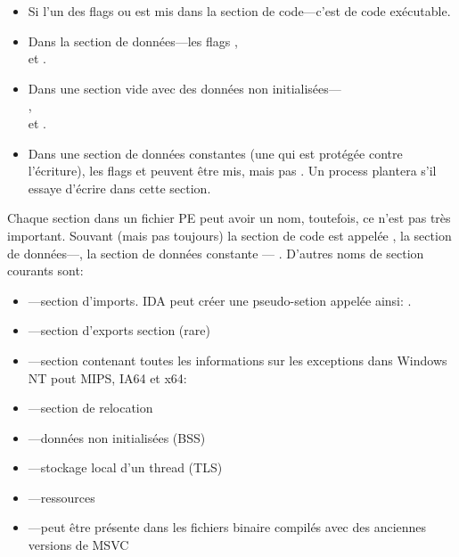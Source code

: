 \begin{itemize}
\item Si l'un des flags  ou 
est mis dans la section de code---c'est de code exécutable.

\item Dans la section de données---les flags ,\\
 et .

\item Dans une section vide avec des données non initialisées---\\
,  \\
et .

\item Dans une section de données constantes (une qui est protégée contre l'écriture),
les flags  et  peuvent
être mis, mais pas .
Un process plantera s'il essaye d'écrire dans cette section.
\end{itemize}

Chaque section dans un fichier PE peut avoir un nom, toutefois, ce n'est pas très
important.
Souvant (mais pas toujours) la section de code est appelée , la section
de données---, la section de données constante ---  .
D'autres noms de section courants sont:

\begin{itemize}
\item {}---section d'imports.
\ac{IDA} peut créer une pseudo-setion appelée ainsi: .
\item {}---section d'exports section (rare)
\item {}---section contenant toutes les informations sur les exceptions
dans Windows NT pout MIPS, \ac{IA64} et x64: 
\item {}---section de relocation
\item {}---données non initialisées (\ac{BSS})
\item {}---stockage local d'un thread (\ac{TLS})
\item {}---ressources
\item {}---peut être présente dans les fichiers binaire compilés avec des
anciennes versions de MSVC
\end{itemize}

